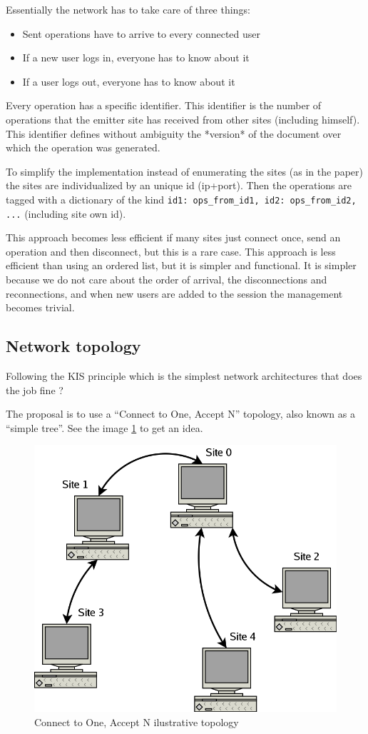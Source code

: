 \documentclass{report}
\begin{document}
Essentially the network has to take care of three things:
\begin{itemize}
\item Sent operations have to arrive to every connected user
\item If a new user logs in, everyone has to know about it
\item If a user logs out, everyone has to know about it
\end{itemize}

Every operation has a specific identifier. This identifier is the number of operations that the emitter site has received from other sites (including himself). This identifier defines without ambiguity the *version* of the document over which the operation was generated.

To simplify the implementation instead of enumerating the sites (as in the paper) the sites are individualized by an unique id (ip+port). Then the operations are tagged with a dictionary of the kind {\texttt {id1: ops\_from\_id1, id2: ops\_from\_id2, ...}} (including site own id).

This approach becomes less efficient if many sites just connect once, send an operation and then disconnect, but this is a rare case. This approach is less efficient than using an ordered list, but it is simpler and functional. It is simpler because we do not care about the order of arrival, the disconnections and reconnections, and when new users are added to the session the management becomes trivial.

\subsection{Network topology}

Following the KIS principle which is the simplest network architectures that does the job fine ?

The proposal is to use a ``Connect to One, Accept N'' topology, also known as a ``simple tree''. See the image \ref{fig:connectooneacceptN} to get an idea.    

\begin{figure}[htbp]
 \begin{center}
    \includegraphics[angle=0,width=0.5\linewidth]{schemas/connect_to_one_accept_N.png}
 \end{center}
 \caption{Connect to One, Accept N ilustrative topology}
 \label{fig:connectooneacceptN}
\end{figure}
\end{document}
